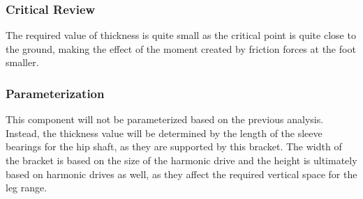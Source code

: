 \subsubsection{Critical Review}
The required value of thickness is quite small as the critical point is quite close to the ground, making the effect of the moment created by friction forces at the foot smaller.

\subsubsection{Parameterization}
This component will not be parameterized based on the previous analysis. Instead, the thickness value will be determined by the length of the sleeve bearings for the hip shaft, as they are supported by this bracket. The width of the bracket is based on the size of the harmonic drive and the height is ultimately based on harmonic drives as well, as they affect the required vertical space for the leg range.